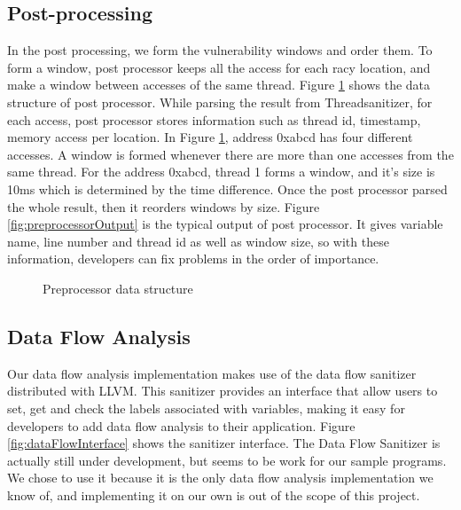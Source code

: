 \documentclass{acm_proc_article-sp}
\begin{document}
\subsection{Post-processing}

In the post processing, we form the vulnerability windows and order them. To form a window, post processor keeps all the access for each racy location, and make a window between accesses of the same thread. Figure \ref{fig:preprocessorDataStructure} shows the data structure of post processor. While parsing the result from Threadsanitizer, for each access, post processor stores information such as thread id, timestamp, memory access per location. In Figure \ref{fig:preprocessorDataStructure}, address 0xabcd has four different accesses. A window is formed whenever there are more than one accesses from the same thread. For the address 0xabcd, thread 1 forms a window, and it's size is 10ms which is determined by the time difference. Once the post processor parsed the whole result, then it reorders windows by size. Figure \ref{fig:preprocessorOutput} is the typical output of post processor. It gives variable name, line number and thread id as well as window size, so with these information, developers can fix problems in the order of importance.

\begin{figure}
\centering
{}
\caption{Preprocessor data structure}
\label{fig:preprocessorDataStructure}
\end{figure}

\begin{figure*}
\centering
{}
\caption{Output of Preprocessor}
\label{fig:preprocessorOutput}
\end{figure*}


\subsection{Data Flow Analysis}

Our data flow analysis implementation makes use of the data flow sanitizer distributed with LLVM. This sanitizer provides an interface that allow users to set, get and check the labels associated with variables, making it easy for developers to add data flow analysis to their application. Figure \ref{fig:dataFlowInterface} shows the sanitizer interface. The Data Flow Sanitizer is actually still under development, but seems to be work for our sample programs. We chose to use it because it is the only data flow analysis implementation we know of, and implementing it on our own is out of the scope of this project.
\end{document}
